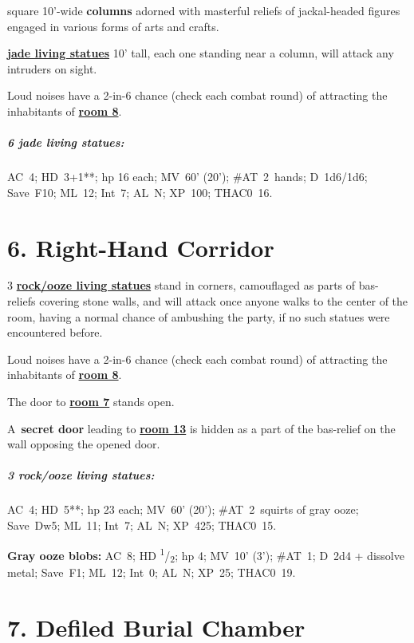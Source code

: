 \documentclass[english,11pt,openany,letterpaper,twocolumn]{book}
\newcommand{\half}{\textsuperscript{1}/\textsubscript{2}}
\begin{document}
 square 10'-wide \textbf{columns} adorned with masterful reliefs of jackal-headed figures engaged in various forms of arts and crafts.

 \hyperlink{statue}{\textbf{jade living statues}} 10' tall, each one standing near a column, will attack any intruders on sight.

\tab Loud noises have a 2-in-6 chance (check each combat round) of attracting the inhabitants of \hyperlink{room8}{\textbf{room 8}}.


\begin{textbox}
	\subparagraph{6 jade living statues:} AC~4; HD~3+1**; hp 16 each; MV~60' (20'); \#AT~2~hands; D~1d6/1d6; Save~F10; ML~12; Int~7; AL~N; XP~100; THAC0~16.
\end{textbox}

\enlargethispage{\baselineskip}

\break

\hypertarget{room6}{}
\section{6. Right-Hand Corridor}

3 \hyperlink{statue}{\textbf{rock/ooze living statues}} stand in corners, camouflaged as parts of bas- reliefs covering stone walls, and will attack once anyone walks to the center of the room, having a normal chance of ambushing the party, if no such statues were encountered before.

\tab Loud noises have a 2-in-6 chance (check each combat round) of attracting the inhabitants of \hyperlink{room8}{\textbf{room 8}}.

\tab The door to \hyperlink{room7}{\textbf{room 7}} stands open.

\tab A~\textbf{secret door} leading to \hyperlink{room13}{\textbf{room 13}} is hidden as a part of the bas-relief on the wall opposing the opened door.

\begin{textbox}
	\subparagraph{3 rock/ooze living statues:} AC~4; HD~5**; hp 23 each; MV~60' (20'); \#AT~2~squirts of gray ooze; Save~Dw5; ML~11; Int~7; AL~N; XP~425; THAC0~15.
	
	\textbf{Gray ooze blobs:} AC~8; HD \half; hp 4; MV~10' (3'); \#AT~1; D~2d4 + dissolve metal; Save~F1; ML~12; Int~0; AL~N; XP~25; THAC0~19.
\end{textbox}


\hypertarget{room7}{}
\section{7. Defiled Burial Chamber}
\end{document}
